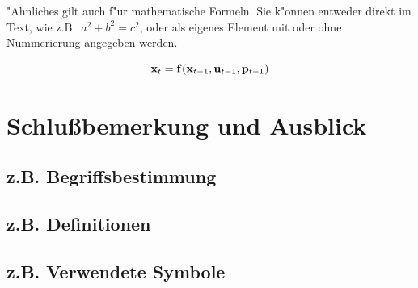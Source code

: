 \documentclass[11pt]{report}
\begin{document}
"Ahnliches gilt auch f"ur mathematische Formeln. Sie k"onnen entweder direkt
im Text, wie z.B.~$a^2+b^2=c^2$, oder als eigenes Element mit oder ohne
Nummerierung angegeben werden.

\begin{equation}
{\bf x}_{t} = {\bf f}({\bf x}_{t-1},{\bf u}_{t-1},{\bf p}_{t-1}) 
\label{System}
\end{equation}


\chapter{Schlu{\ss}bemerkung und Ausblick}
  \label{kap:ausblick}

\begin{appendix}
\chapter{z.B. Begriffsbestimmung}
\section{z.B. Definitionen}
%
\section{z.B. Verwendete Symbole}
%
\end{appendix}


\nocite{mseifter88,pmandl97,weiss92,weiss92a,ginthoer93}

\newpage
\addtocounter{page}{1}
\addtocounter{page}{-1}





%
\end{document}
